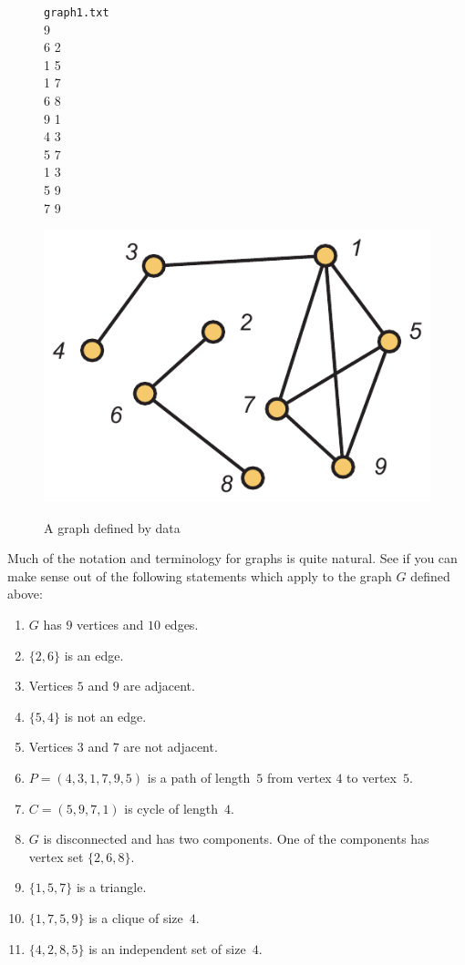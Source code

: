 \hspace{.5in}
\begin{figure}
\begin{minipage}{1.5in}
\texttt{graph1.txt}\\
9\\
6 2\\
1 5\\
1 7\\
6 8\\
9 1\\
4 3\\
5 7\\
1 3\\
5 9\\
7 9
\end{minipage}
\begin{minipage}{3in}
\includegraphics[scale=.6]{intro-figs/3012-fig15}\\
\caption{A graph defined by data}
\label{fig:graphdata}
\end{minipage}
\end{figure}

\medskip
Much of the notation and terminology for graphs is quite natural.
See if you can make sense out of the following statements which
apply to the graph $G$ defined above:
\begin{enumerate}
\item $G$ has $9$ vertices and $10$ edges.
\item $\{2,6\}$ is an edge.
\item Vertices $5$ and $9$ are adjacent.
\item $\{5,4\}$ is not an edge.
\item Vertices $3$ and $7$ are not adjacent.
\item $P = (4, 3,1, 7,9,5)$ is a path 
of length~$5$ from vertex $4$ to vertex~$5$.
\item $C=(5,9,7,1)$ is cycle of length~$4$.
\item $G$ is disconnected and has two components.
One of the components has vertex set $\{2,6,8\}$.
\item $\{1,5,7\}$ is a triangle.
\item $\{1,7,5,9\}$ is a clique of size~$4$.
\item $\{4,2,8,5\}$ is an independent set of
size~$4$.
\end{enumerate}

